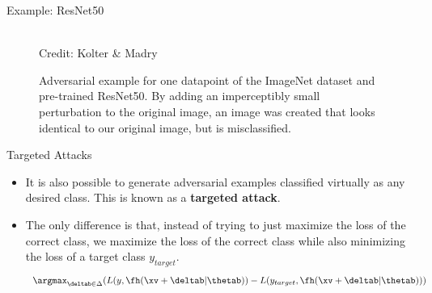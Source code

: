 \documentclass[11pt,compress,t,notes=noshow]{beamer}
\begin{document}
\begin{frame} {Example: ResNet50}
  \begin{figure}
    \centering
     \tiny{\\Credit: Kolter \& Madry}
     \vspace{-0.2cm}
      \caption{Adversarial example for one datapoint of the ImageNet dataset and pre-trained ResNet50. By adding an imperceptibly small perturbation to the original image,  an image was created that looks identical to our original image, but is misclassified.}
  \end{figure}
\end{frame}

\begin{frame}{Targeted Attacks}
    \begin{itemize}
        \item It is also possible to generate adversarial examples classified virtually as any desired class. This is known as a \textbf{targeted attack}.
        \item The only difference is that, instead of trying to just maximize the loss of the correct class, we maximize the loss of the correct class while also minimizing the loss of a target class $y_{target}$.
        \begin{equation*}
             \argmax_{\deltab \in \Delta} ( L(y, \fh(\xv + \deltab| \thetab)) - L(y_{target}, \fh(\xv + \deltab| \thetab)) )
        \end{equation*}
    \end{itemize}
\end{frame}
  
\end{document}
